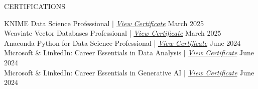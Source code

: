 \begin{rSection}{CERTIFICATIONS}

    {KNIME Data Science Professional} | \href{https://www.linkedin.com/learning/certificates/ddf6059c4b4acc63f7c4d265c86b70e5352600af6e70848b8d1e4a00f0dd7e50?u=90799586}{\textit{View Certificate}} \hfill {March 2025} \\
    {Weaviate Vector Databases Professional} | \href{https://www.linkedin.com/learning/certificates/0f017fc1872da251440564a767da84808ef02e30ee2fb3ed583f4f5a133dd6da?u=90799586}{\textit{View Certificate}} \hfill {March 2025} \\
    {Anaconda Python for Data Science Professional} | \href{https://www.linkedin.com/learning/certificates/4f793772d84e101772da3b9d18c07030b6cc7aac590ebdb5f60daa46301f43d3?u=90799586}{\textit{View Certificate}} \hfill {June 2024} \\   
    {Microsoft \& LinkedIn: Career Essentials in Data Analysis} | \href{https://www.linkedin.com/learning/certificates/0b7ca5c28084084194c6e8cd821574cd61eeb1c4505fb94d99f1fc9ea21edfc5?u=90799586}{\textit{View Certificate}} \hfill {June 2024} \\  
    {Microsoft \& LinkedIn: Career Essentials in Generative AI} | \href{https://www.linkedin.com/learning/certificates/656804fa74acc29a8698e8ccbf3394c5f35c45a96180313ceb3d6b847bf75fda?u=90799586}{\textit{View Certificate}} \hfill {June 2024}

\end{rSection}
